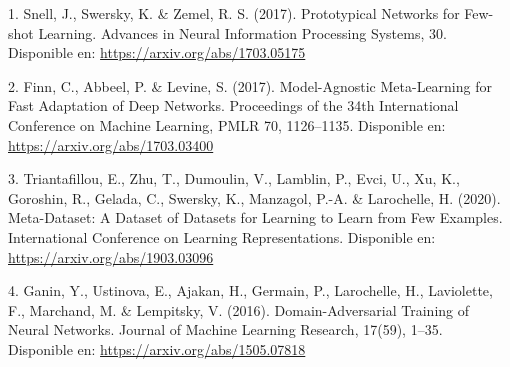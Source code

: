 1. Snell, J., Swersky, K. \& Zemel, R. S. (2017). Prototypical Networks for Few-shot Learning. Advances in Neural Information Processing Systems, 30. Disponible en: \url{https://arxiv.org/abs/1703.05175}

2. Finn, C., Abbeel, P. \& Levine, S. (2017). Model-Agnostic Meta-Learning for Fast Adaptation of Deep Networks. Proceedings of the 34th International Conference on Machine Learning, PMLR 70, 1126--1135. Disponible en: \url{https://arxiv.org/abs/1703.03400}

3. Triantafillou, E., Zhu, T., Dumoulin, V., Lamblin, P., Evci, U., Xu, K., Goroshin, R., Gelada, C., Swersky, K., Manzagol, P.-A. \& Larochelle, H. (2020). Meta-Dataset: A Dataset of Datasets for Learning to Learn from Few Examples. International Conference on Learning Representations. Disponible en: \url{https://arxiv.org/abs/1903.03096}

4. Ganin, Y., Ustinova, E., Ajakan, H., Germain, P., Larochelle, H., Laviolette, F., Marchand, M. \& Lempitsky, V. (2016). Domain-Adversarial Training of Neural Networks. Journal of Machine Learning Research, 17(59), 1--35. Disponible en: \url{https://arxiv.org/abs/1505.07818}
